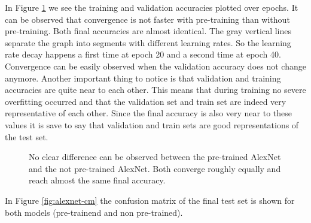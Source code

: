 \quad

In Figure \ref{fig:alexnet-graph} we see the training and validation accuracies plotted over epochs. It can be observed that convergence is not faster with pre-training than without pre-training. Both final accuracies are almost identical. The gray vertical lines separate the graph into segments with different learning rates. So the learning rate decay happens a first time at epoch 20 and a second time at epoch 40. Convergence can be easily observed when the validation accuracy does not change anymore. Another important thing to notice is that validation and training accuracies are quite near to each other. This means that during training no severe overfitting occurred and that the validation set and train set are indeed very representative of each other. Since the final accuracy is also very near to these values it is save to say that validation and train sets are good representations of the test set. \\


\begin{figure}[!h]
\centering
\caption{No clear difference can be observed between the pre-trained AlexNet and the not pre-trained AlexNet. Both converge roughly equally and reach almost the same final accuracy.}
\label{fig:alexnet-graph}
\end{figure}

\quad

In Figure \ref{fig:alexnet-cm} the confusion matrix of the final test set is shown for both models (pre-trainend and non pre-trained). \\


